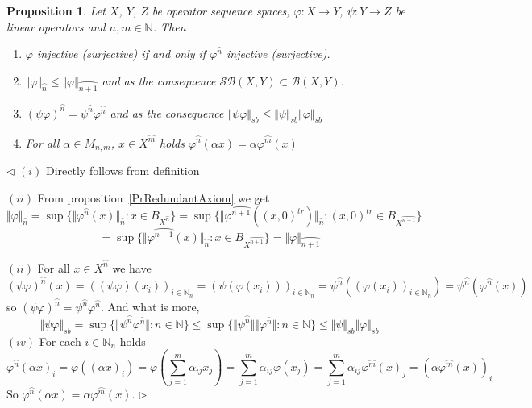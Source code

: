 \documentclass[12pt]{article}
\newtheorem{proposition}[theorem]{Proposition}
\newenvironment{proof}{\par $\triangleleft$}{$\triangleright$}
\begin{document}
\begin{proposition}\label{PrSimplAmplProps} Let $X$, $Y$, $Z$ be operator
sequence spaces, $\varphi:X\to Y$, $\psi:Y\to Z$ be linear operators and
$n,m\in\mathbb{N}$. Then 
\begin{enumerate}[label = (\roman*)]
    \item $\varphi$ injective (surjective) 
    if and only if  $\varphi^{\wideparen{n}}$ injective (surjective).
    
    \item $\Vert\varphi\Vert_{\wideparen{n}}
    \leq\Vert\varphi\Vert_{\wideparen{n+1}}$
    and as the consequence $\mathcal{SB}(X,Y)\subset\mathcal{B}(X,Y)$.
    
    \item ${(\psi\varphi)}^{\wideparen{n}}
    =\psi^{\wideparen{n}}\varphi^{\wideparen{n}}$
    and as the consequence
    $\Vert\psi\varphi\Vert_{sb}
    \leq\Vert\psi\Vert_{sb}\Vert\varphi\Vert_{sb}$
    
    \item For all $\alpha\in M_{n,m}$, $x\in X^{\wideparen{m}}$ holds
    $\varphi^{\wideparen{n}}(\alpha x)=\alpha\varphi^{\wideparen{m}}(x)$
\end{enumerate}
\end{proposition}
\begin{proof}
$(i)$ Directly follows from definition

$(ii)$ From proposition~\ref{PrRedundantAxiom} we get
$$
\Vert\varphi\Vert_{\wideparen{n}}
=\sup \{
    \Vert
        \varphi^{\wideparen{n}}(x)
    \Vert_{\wideparen{n}}:x\in B_{X^{\wideparen{n}}} \}
=\sup \{
    \Vert
        \varphi^{\wideparen{n+1}}({(x,0)}^{tr})
    \Vert_{\wideparen{n}}:{(x,0)}^{tr}\in B_{X^{\wideparen{n+1}}} \}
$$
$$
=\sup \{
    \Vert
        \varphi^{\wideparen{n+1}}(x)
    \Vert_{\wideparen{n}}:x\in B_{X^{\wideparen{n+1}}} \}
=\Vert\varphi\Vert_{\wideparen{n+1}}
$$	

$(ii)$ For all $x\in X^{\wideparen{n}}$ we have
$$
{(\psi\varphi)}^{\wideparen{n}}(x)
={((\psi\varphi)(x_i))}_{i\in\mathbb{N}_n}
={(\psi(\varphi(x_i)))}_{i\in\mathbb{N}_n}
={\psi}^{\wideparen{n}}({(\varphi(x_i))}_{i\in\mathbb{N}_n})
=\psi^{\wideparen{n}}(\varphi^{\wideparen{n}}(x))
$$
so 
${(\psi\varphi)}^{\wideparen{n}}=\psi^{\wideparen{n}}\varphi^{\wideparen{n}}$. 
And what is more, 
$$
\Vert\psi\varphi\Vert_{sb}
=\sup \{\Vert\psi^{\wideparen{n}}\varphi^{\wideparen{n}}\Vert:n\in\mathbb{N} \}
\leq\sup \{
    \Vert
        \psi^{\wideparen{n}}
    \Vert\Vert\varphi^{\wideparen{n}}\Vert:n\in\mathbb{N} \}
\leq\Vert\psi\Vert_{sb}\Vert\varphi\Vert_{sb}
$$
$(iv)$ For each $i\in\mathbb{N}_n$ holds
$$
\varphi^{\wideparen{n}}{(\alpha x)}_i 
=\varphi({(\alpha x)}_i)
=\varphi\left(\sum\limits_{j=1}^m \alpha_{ij }x_j\right)
=\sum\limits_{j=1}^m\alpha_{ij} \varphi(x_j) 
=\sum\limits_{j=1}^m\alpha_{ij}{\varphi^{\wideparen{m}}(x)}_j
={(\alpha\varphi^{\wideparen{m}}(x))}_i
$$
So $\varphi^{\wideparen{n}}(\alpha x)=\alpha\varphi^{\wideparen{m}}(x)$.
\end{proof}
\end{document}
